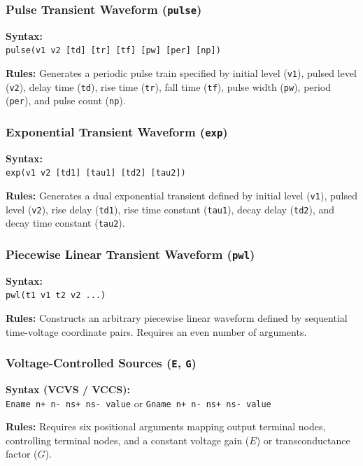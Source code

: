 \subsubsection{Pulse Transient Waveform (\texttt{pulse})}
\begin{compactitem}
    \item \textbf{Syntax:} \\
    \texttt{pulse(v1 v2 [td] [tr] [tf] [pw] [per] [np])}
    \item \textbf{Rules:} Generates a periodic pulse train specified by initial level (\texttt{v1}), pulsed level (\texttt{v2}), delay time (\texttt{td}), rise time (\texttt{tr}), fall time (\texttt{tf}), pulse width (\texttt{pw}), period (\texttt{per}), and pulse count (\texttt{np}).
\end{compactitem}

\subsubsection{Exponential Transient Waveform (\texttt{exp})}
\begin{compactitem}
    \item \textbf{Syntax:} \\
    \texttt{exp(v1 v2 [td1] [tau1] [td2] [tau2])}
    \item \textbf{Rules:} Generates a dual exponential transient defined by initial level (\texttt{v1}), pulsed level (\texttt{v2}), rise delay (\texttt{td1}), rise time constant (\texttt{tau1}), decay delay (\texttt{td2}), and decay time constant (\texttt{tau2}).
\end{compactitem}

\subsubsection{Piecewise Linear Transient Waveform (\texttt{pwl})}
\begin{compactitem}
    \item \textbf{Syntax:} \\
    \texttt{pwl(t1 v1 t2 v2 ...)}
    \item \textbf{Rules:} Constructs an arbitrary piecewise linear waveform defined by sequential time-voltage coordinate pairs. Requires an even number of arguments.
\end{compactitem}

\subsubsection{Voltage-Controlled Sources (\texttt{E}, \texttt{G})}
\begin{compactitem}
    \item \textbf{Syntax (VCVS / VCCS):} \\
    \texttt{Ename n+ n- ns+ ns- value} or \texttt{Gname n+ n- ns+ ns- value}
    \item \textbf{Rules:} Requires six positional arguments mapping output terminal nodes, controlling terminal nodes, and a constant voltage gain ($E$) or transconductance factor ($G$).
\end{compactitem}

